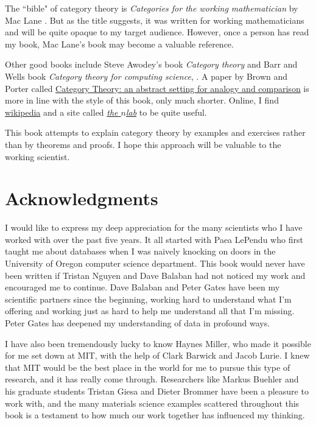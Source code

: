 The ``bible" of category theory is {\em Categories for the working mathematician} by Mac Lane \cite{Mac}. But as the title suggests, it was written for working mathematicians and will be quite opaque to my target audience. However, once a person has read my book, Mac Lane's book may become a valuable reference. 

Other good books include Steve Awodey's book {\em Category theory} \cite{Awo} and Barr and Wells book {\em Category theory for computing science}, \cite{BW}.  A paper by Brown and Porter called  \href{http://pages.bangor.ac.uk/\%7Emas010/pdffiles/Analogy-and-Comparison.pdf}{\text Category Theory: an abstract setting for analogy and comparison} \cite{BP1} is more in line with the style of this book, only much shorter. Online, I find \href{http://www.wikipedia.org}{\text wikipedia} and a site called \href{http://ncatlab.org/nlab/show/HomePage}{\em the $n$lab} to be quite useful. 

This book attempts to explain category theory by examples and exercises rather than by theorems and proofs. I hope this approach will be valuable to the working scientist.


\section{Acknowledgments}

I would like to express my deep appreciation for the many scientists who I have worked with over the past five years. It all started with Paea LePendu who first taught me about databases when I was naively knocking on doors in the University of Oregon computer science department. This book would never have been written if Tristan Nguyen and Dave Balaban had not noticed my work and encouraged me to continue. Dave Balaban and Peter Gates have been my scientific partners since the beginning, working hard to understand what I'm offering and working just as hard to help me understand all that I'm missing. Peter Gates has deepened my understanding of data in profound ways. 

I have also been tremendously lucky to know Haynes Miller, who made it possible for me set down at MIT, with the help of Clark Barwick and Jacob Lurie. I knew that MIT would be the best place in the world for me to pursue this type of research, and it has really come through. Researchers like Markus Buehler and his graduate students Tristan Giesa and Dieter Brommer have been a pleasure to work with, and the many materials science examples scattered throughout this book is a testament to how much our work together has influenced my thinking. 

